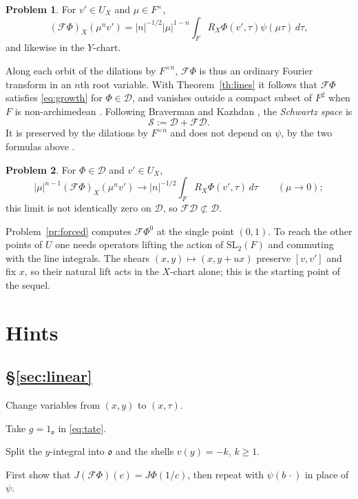 \documentclass[reqno]{amsart}
\newcommand{\SL}{\mathrm{SL}_2}
\newcommand{\Fc}{\mathcal{F}}
\newcommand{\Dc}{\mathcal{D}}
\newcommand{\Sc}{\mathcal{S}}
\newcommand{\oo}{\mathfrak{o}}
\numberwithin{equation}{section}
\theoremstyle{definition}
\newtheorem{problem}{Problem}[section]
\theoremstyle{plain}
\newenvironment{hints}{\begin{description}[font=\normalfont\bfseries]}{\end{description}}
\begin{document}
\begin{problem}\label{pr:ft-root}
  For $v' \in U_X$ and $\mu \in F^\times$,
  \begin{equation*}
    (\Fc \Phi)_X(\mu^n v') = \lvert n \rvert^{-1/2} \lvert \mu \rvert^{1-n} \int_F R_X \Phi(v', \tau) \psi(\mu \tau) \, d \tau,
  \end{equation*}
  and likewise in the $Y$-chart.
\end{problem}

Along each orbit of the dilations by $F^{\times n}$, $\Fc \Phi$ is thus an ordinary Fourier transform in an $n$th root variable.  With Theorem~\ref{th:lines} it follows that $\Fc \Phi$ satisfies \eqref{eq:growth} for $\Phi \in \Dc$, and vanishes outside a compact subset of $F^2$ when $F$ is non-archimedean \cite[Corollary~4.10]{N}.  Following Braverman and Kazhdan \cite[\S3.1]{BK99}, the \emph{Schwartz space} is
\begin{equation*}
  \Sc := \Dc + \Fc \Dc.
\end{equation*}
It is preserved by the dilations by $F^{\times n}$ and does not depend on $\psi$, by the two formulas above \cite[Lemma~4.12]{N}.

\begin{problem}\label{pr:schwartz-not-D}
  For $\Phi \in \Dc$ and $v' \in U_X$,
  \begin{equation*}
    \lvert \mu \rvert^{n-1} (\Fc \Phi)_X(\mu^n v') \to \lvert n \rvert^{-1/2} \int_F R_X \Phi(v', \tau) \, d \tau
    \qquad (\mu \to 0);
  \end{equation*}
  this limit is not identically zero on $\Dc$, so $\Fc \Dc \not\subset \Dc$.
\end{problem}

Problem~\ref{pr:forced} computes $\Fc \Phi^0$ at the single point $(0, 1)$.  To reach the other points of $U$ one needs operators lifting the action of $\SL(F)$ and commuting with the line integrals.  The shears $(x, y) \mapsto (x, y + u x)$ preserve $[v, v']$ and fix $x$, so their natural lift acts in the $X$-chart alone; this is the starting point of the sequel.


\section*{Hints}

\subsection*{\S\ref{sec:linear}}
\begin{hints}
\item[\ref{pr:lin-lines}] Change variables from $(x, y)$ to $(x, \tau)$.
\item[\ref{pr:lin-tate}] Take $g = 1_\oo$ in \eqref{eq:tate}.
\item[\ref{pr:lin-spherical}] Split the $y$-integral into $\oo$ and the shells $v(y) = -k$, $k \geq 1$.
\item[\ref{pr:lin-voronoi}] First show that $J(\Fc \Phi)(c) = J \Phi(1/c)$, then repeat with $\psi(b \, \cdot)$ in place of $\psi$.
\end{hints}
\end{document}
